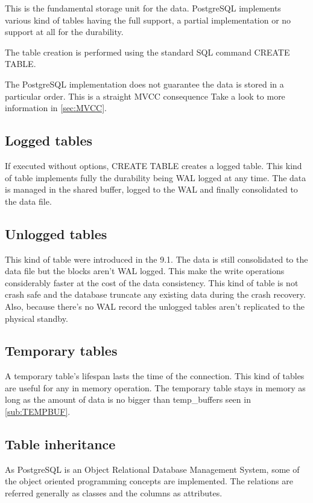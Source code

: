 This is the fundamental storage unit for the data. PostgreSQL implements 
various kind of tables having the full support, a partial implementation or no 
support at all for the durability.

The table creation is performed using the standard SQL command CREATE TABLE. 

The PostgreSQL implementation does not guarantee the data is stored in a 
particular order. This is a straight MVCC consequence Take a look to 
more information in \ref{sec:MVCC}. 

\subsection{Logged tables}
If executed without options, CREATE TABLE creates a logged table. This kind of 
table implements fully the durability being WAL logged at any time. The data is 
managed in the shared buffer, logged to the WAL and finally consolidated to the 
data file. 

\subsection{Unlogged tables}
\label{sub:UNLOGGEDTABLES}
This kind of table were introduced in the 9.1. The data is still consolidated 
to the data file but the blocks aren't WAL logged. This make the write 
operations considerably faster at the cost of the data consistency. This kind 
of table is not crash safe and the database truncate any existing data during 
the crash recovery. Also, because there's no WAL record the unlogged tables 
aren't replicated to the physical standby. 

\subsection{Temporary tables}
A temporary table's lifespan lasts the time of the connection. This kind of 
tables are useful for any in memory operation. The temporary table stays in 
memory as long as the amount of data is no bigger than 
temp\_buffers seen in \ref{sub:TEMPBUF}. 

\subsection{Table inheritance}
As PostgreSQL is an Object Relational Database Management System, some of the 
object oriented programming concepts are implemented. The relations are 
referred generally as classes and the columns as attributes. 

